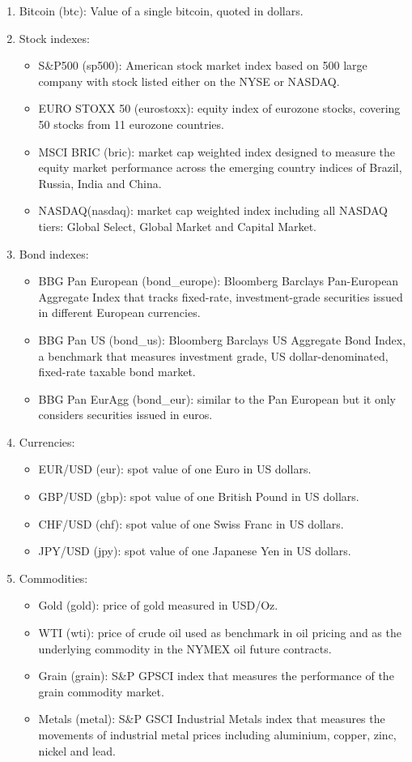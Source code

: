 \begin{enumerate}
	\item Bitcoin (btc): Value of a single bitcoin, quoted in dollars.
	\item Stock indexes:
	\begin{itemize}
		\item S\&P500 (sp500): American stock market index based on 500 large company with stock listed either on the NYSE or NASDAQ.
		\item EURO STOXX 50 (eurostoxx): equity index of eurozone stocks, covering 50 stocks from 11 eurozone countries.
		\item MSCI BRIC (bric): market cap weighted index designed to measure the equity market performance across the emerging country indices of Brazil, Russia, India and China.
		\item NASDAQ(nasdaq): market cap weighted index including all NASDAQ tiers: Global Select, Global Market and Capital Market.
	\end{itemize}
	\item Bond indexes:
	\begin{itemize}
		\item BBG Pan European (bond\_europe): Bloomberg Barclays Pan-European Aggregate Index that tracks fixed-rate, investment-grade securities issued in different European currencies.
		\item BBG Pan US (bond\_us): Bloomberg Barclays US Aggregate Bond Index, a benchmark that measures investment grade, US dollar-denominated, fixed-rate taxable bond market.
		\item BBG Pan EurAgg (bond\_eur): similar to the Pan European but it only considers securities issued in euros.
	\end{itemize} 
	\item Currencies:
	\begin{itemize}
		\item EUR/USD (eur): spot value of one Euro in  US dollars. 
		\item GBP/USD (gbp): spot value of one British Pound in US dollars.
		\item CHF/USD (chf): spot value of one Swiss Franc in  US dollars.
		\item JPY/USD (jpy): spot value of one Japanese Yen in  US dollars.
	\end{itemize}
	\item Commodities:
	\begin{itemize}
		\item Gold (gold): price of gold measured in USD/Oz.
		\item WTI (wti): price of crude oil used as benchmark in oil pricing and as the underlying commodity in the NYMEX oil future contracts.
		\item Grain (grain): S\&P GPSCI index that measures the performance of the grain commodity market.
		\item Metals (metal): S\&P GSCI Industrial Metals index that measures the movements of industrial metal prices including aluminium, copper, zinc, nickel and lead.
	\end{itemize}
\end{enumerate}

